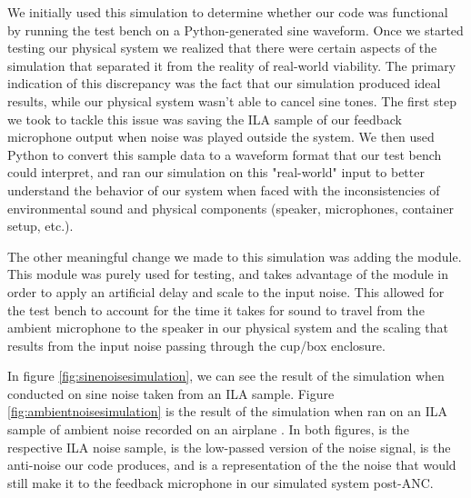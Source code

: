 \documentclass{fpgairpods}
\begin{document}
We initially used this simulation to determine whether our code was functional by running the test bench on a Python-generated sine waveform. Once we started testing our physical system we realized that there were certain aspects of the simulation that separated it from the reality of real-world viability. The primary indication of this discrepancy was the fact that our simulation produced ideal results, while our physical system wasn't able to cancel sine tones. The first step we took to tackle this issue was saving the ILA sample of our feedback microphone output when noise was played outside the system. We then used Python to convert this sample data to a waveform format that our test bench could interpret, and ran our simulation on this "real-world" input to better understand the behavior of our system when faced with the inconsistencies of environmental sound and physical components (speaker, microphones, container setup, etc.).

The other meaningful change we made to this simulation was adding the  module. This module was purely used for testing, and takes advantage of the  module in order to apply an artificial delay and scale to the input noise. This allowed for the test bench to account for the time it takes for sound to travel from the ambient microphone to the speaker in our physical system and the scaling that results from the input noise passing through the cup/box enclosure.

In figure \ref{fig:sinenoisesimulation}, we can see the result of the simulation when conducted on sine noise taken from an ILA sample. Figure \ref{fig:ambientnoisesimulation} is the result of the simulation when ran on an ILA sample of ambient noise recorded on an airplane \cite{airplane}. In both figures,  is the respective ILA noise sample,  is the low-passed version of the noise signal,  is the anti-noise our code produces, and  is a representation of the the noise that would still make it to the feedback microphone in our simulated system post-ANC.
\end{document}
